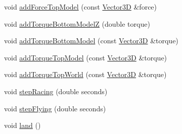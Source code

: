 \begin{DoxyCompactItemize}
\item 
void \hyperlink{class_lagrange_1_1_lagrangian_racer_a19901db0943f63fae28667b751bb1bf4}{add\-Force\-Top\-Model} (const \hyperlink{class_vector3_d}{Vector3\-D} \&force)
\item 
void \hyperlink{class_lagrange_1_1_lagrangian_racer_a28b28f9259ce4cbaf6ebd5b056c61c8f}{add\-Torque\-Bottom\-Model\-Z} (double torque)
\item 
void \hyperlink{class_lagrange_1_1_lagrangian_racer_a3dc8d7072a7370907e1b82efd50a6b58}{add\-Torque\-Bottom\-Model} (const \hyperlink{class_vector3_d}{Vector3\-D} \&torque)
\item 
void \hyperlink{class_lagrange_1_1_lagrangian_racer_a1ac741a8d3a369c3a62c487a7ae79d7a}{add\-Torque\-Top\-Model} (const \hyperlink{class_vector3_d}{Vector3\-D} \&torque)
\item 
void \hyperlink{class_lagrange_1_1_lagrangian_racer_a8fff6f5f11dc051c712c924f43251dfe}{add\-Torque\-Top\-World} (const \hyperlink{class_vector3_d}{Vector3\-D} \&torque)
\item 
void \hyperlink{class_lagrange_1_1_lagrangian_racer_addb45d891a16d0b839be8d10f2fcd557}{step\-Racing} (double seconds)
\item 
void \hyperlink{class_lagrange_1_1_lagrangian_racer_a53288dff55d60e9bce9564e5e30b6652}{step\-Flying} (double seconds)
\item 
void \hyperlink{class_lagrange_1_1_lagrangian_racer_a1d34f95637932a0402e90aef7b4d7d64}{land} ()
\end{DoxyCompactItemize}


